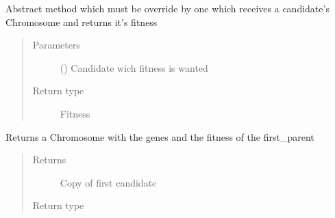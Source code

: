 \documentclass[letterpaper,10pt,english]{sphinxmanual}
\begin{document}
\begin{fulllineitems}
\begin{fulllineitems}
\label{\detokenize{MolOpt.genetic:MolOpt.genetic.genetic.Genetic.get_fitness}}
\sphinxAtStartPar
Abstract method which must be override by one which receives a candidate’s Chromosome and returns it’s
fitness
\begin{quote}\begin{description}
\item[{Parameters}] \leavevmode
\sphinxAtStartPar
{} () \textendash{} Candidate wich fitness is wanted

\item[{Return type}] \leavevmode
\sphinxAtStartPar
Fitness

\end{description}\end{quote}

\end{fulllineitems}


\begin{fulllineitems}
\label{\detokenize{MolOpt.genetic:MolOpt.genetic.genetic.Genetic.load}}
\sphinxAtStartPar
Returns a Chromosome with the genes and the fitness of the first\_parent
\begin{quote}\begin{description}
\item[{Returns}] \leavevmode
\sphinxAtStartPar
Copy of first candidate

\item[{Return type}] \leavevmode
\sphinxAtStartPar
{\hyperref[\detokenize{MolOpt.genetic:MolOpt.genetic.genetic.Chromosome}]{}}

\end{description}\end{quote}


\end{fulllineitems}
\end{fulllineitems}
\end{document}
